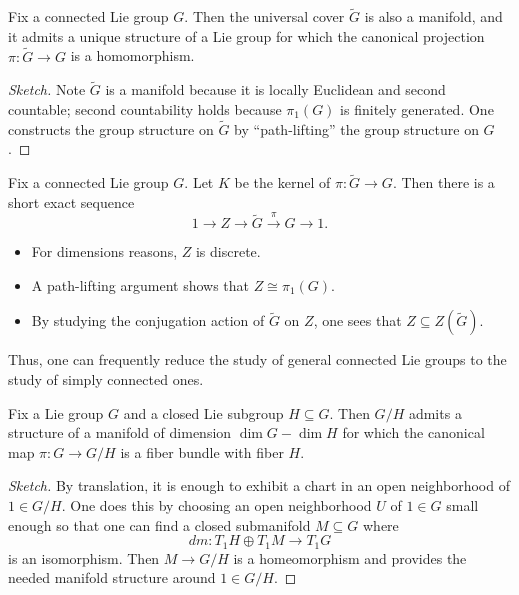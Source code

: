 \documentclass{article}
\begin{document}
\begin{lemma}
	Fix a connected Lie group $G$. Then the universal cover $\widetilde G$ is also a manifold, and it admits a unique structure of a Lie group for which the canonical projection $\pi\colon\widetilde G\to G$ is a homomorphism.
\end{lemma}
\begin{proof}[Sketch]
	Note $\widetilde G$ is a manifold because it is locally Euclidean and second countable; second countability holds because $\pi_1(G)$ is finitely generated. One constructs the group structure on $\widetilde G$ by ``path-lifting'' the group structure on $G$.
\end{proof}
\begin{remark}
	Fix a connected Lie group $G$. Let $K$ be the kernel of $\pi\colon\widetilde G\to G$. Then there is a short exact sequence
	\[1\to Z\to\widetilde G\stackrel\pi\to G\to1.\]
	\begin{itemize}
		\item For dimensions reasons, $Z$ is discrete.
		\item A path-lifting argument shows that $Z\cong\pi_1(G)$.
		\item By studying the conjugation action of $\widetilde G$ on $Z$, one sees that $Z\subseteq Z(\widetilde G)$.
	\end{itemize}
	Thus, one can frequently reduce the study of general connected Lie groups to the study of simply connected ones.
\end{remark}
\begin{proposition}
	Fix a Lie group $G$ and a closed Lie subgroup $H\subseteq G$. Then $G/H$ admits a structure of a manifold of dimension $\dim G-\dim H$ for which the canonical map $\pi\colon G\to G/H$ is a fiber bundle with fiber $H$.
\end{proposition}
\begin{proof}[Sketch]
	By translation, it is enough to exhibit a chart in an open neighborhood of $1\in G/H$. One does this by choosing an open neighborhood $U$ of $1\in G$ small enough so that one can find a closed submanifold $M\subseteq G$ where
	\[dm\colon T_1H\oplus T_1M\to T_1G\]
	is an isomorphism. Then $M\to G/H$ is a homeomorphism and provides the needed manifold structure around $1\in G/H$.
\end{proof}
\end{document}
